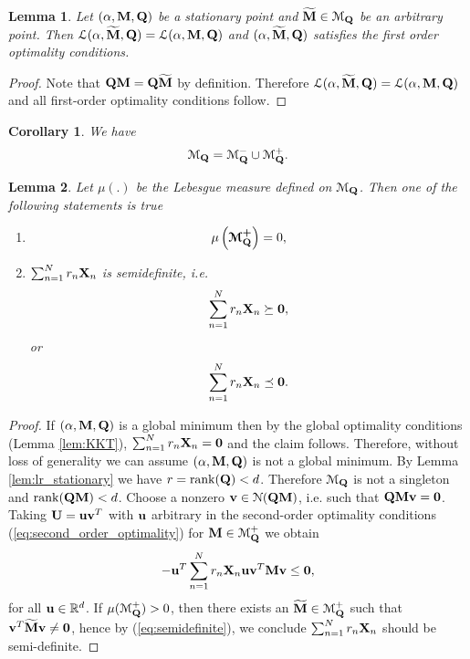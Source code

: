 \documentclass[11pt]{article}
\theoremstyle{plain}
\newtheorem{lemma}{Lemma}
\newtheorem{corollary}{Corollary}
\DeclareMathOperator*{\rank}{rank}
\def\R{\mathbb{R}}
\theoremstyle{plain}
\numberwithin{equation}{section}
\numberwithin{lemma}{section}
\numberwithin{theorem}{section}
\numberwithin{corollary}{section}
\numberwithin{observation}{section}
\numberwithin{definition}{section}
\numberwithin{example}{section}
\begin{document}
\begin{lemma} Let $(\alpha,\Mx{M},\Mx{Q})$ be a stationary point and $\widetilde{\Mx{M}} \in \mathcal{M}_{\Mx{Q}}$ be an arbitrary point. Then $\mathcal{L}(\alpha, \widetilde{\Mx{M}},\Mx{Q}) = \mathcal{L}(\alpha, \Mx{M},\Mx{Q})$ and $(\alpha, \widetilde{\Mx{M}},\Mx{Q})$ satisfies the first order optimality conditions.
\end{lemma}
\begin{proof}
Note that $\Mx{Q}\Mx{M} = \Mx{Q}\widetilde{\Mx{M}}$ by definition. Therefore  $\mathcal{L}(\alpha, \widetilde{\Mx{M}},\Mx{Q}) = \mathcal{L}(\alpha, \Mx {M},\Mx{Q})$ and all first-order optimality conditions follow.
\end{proof}
\begin{corollary} We have
\[
\mathcal{M}_{\Mx{Q}} = \mathcal{M}^-_{\Mx{Q}} \cup \mathcal{M}^+_{\Mx{Q}}.
\]
\end{corollary}
\begin{lemma} \label{lem:measure_0} Let $\mu(.)$ be the Lebesgue measure defined on $\mathcal{M}_{\Mx{Q}}$. Then one of the following statements is true
\begin{enumerate}
    \item 
    \[
    \mu \left(\Mx{\mathcal{M}^+_{\Mx{Q}}} \right) =0,
    \]
    \item $\sum_{n=1}^N r_n \Mx{X}_n $ is semidefinite, i.e.
    \[
    \sum_{n=1}^N r_n \Mx{X}_n \succeq \Mx{0},
    \] or
    \[
    \sum_{n=1}^N r_n \Mx{X}_n \preceq \Mx{0}.
    \]
\end{enumerate}
\end{lemma}


\begin{proof}
If $(\alpha,\Mx{M},\Mx{Q})$ is a global minimum then by the global optimality conditions (Lemma \ref{lem:KKT}), $\sum_{n=1}^N r_n \Mx{X}_n = \Mx{0}$ and the claim follows. Therefore, without loss of generality we can assume $(\alpha,\Mx{M},\Mx{Q})$ is not a global minimum.
By Lemma \ref{lem:lr_stationary} we have $r = \rank(\Mx{Q}) < d$. Therefore $\mathcal{M}_{\Mx{Q}}$ is not a singleton and $\rank(\Mx{QM}) < d$. Choose a nonzero $\V{v} \in \mathcal{N}(\Mx{Q M})$, i.e. such that $\Mx{Q M}\V{v} = \Mx{0}$.
Taking $\Mx{U} = \V{uv}^T$ with $\V{u}$ arbitrary in the second-order optimality conditions (\ref{eq:second_order_optimality}) for $\Mx{M} \in \mathcal{M}^+_{\Mx{Q}}$ we obtain
\begin{equation} \label{eq:semidefinite}
    -\V{u}^T \sum_{n = 1}^N r_n \Mx{X}_n  \V{u v}^T \Mx{M} \V{v} \leq \Mx{0},   
\end{equation}
for all $\V{u} \in \R^d$. If $\mu(\mathcal{M}^+_{\Mx{Q}})>0$, then there exists an $\widetilde{\Mx{M}}\in \mathcal{M}^+_{\Mx{Q}}$ such that $ \V{v}^T \widetilde{\Mx{M}} \V{v} \neq \Mx{0}$, hence by (\ref{eq:semidefinite}), we conclude $\sum_{n=1}^N r_n \Mx{X}_n$ should be semi-definite.
\end{proof}
\end{document}
